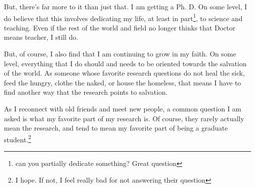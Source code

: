 \documentclass[12pt]{article}[titlepage]
\newcommand{\1}{\={a}}
\newcommand{\2}{\={e}}
\newcommand{\3}{\={\i}}
\newcommand{\4}{\=o}
\newcommand{\5}{\=u}
\newcommand{\6}{\={A}}
\renewcommand{\,}{\textsuperscript{,}}
\begin{document}
But, there's far more to it than just that.
I am getting a Ph. D. 
On some level, I do believe that this involves dedicating my life, at least in part\footnote{can you partially dedicate something? Great question}, to science and teaching.
Even if the rest of the world and field no longer thinks that Doctor means teacher, I still do.

But, of course, I also find that I am continuing to grow in my faith.
On some level, everything that I do should and needs to be oriented towards the salvation of the world.
As someone whose favorite research questions do not heal the sick, feed the hungry, clothe the naked, or house the homeless, that means I have to find another way that the research points to salvation.

As I reconnect with old friends and meet new people, a common question I am asked is what my favorite part of my research is.
Of course, they rarely actually mean the research, and tend to mean my favorite part of being a graduate student.\footnote{I hope. If not, I feel really bad for not answering their question}
\end{document}
